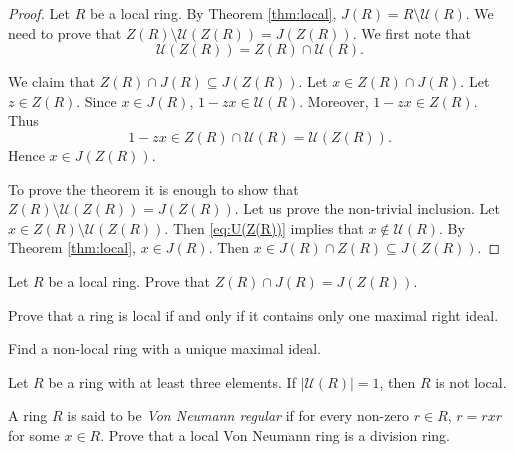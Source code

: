 \begin{proof}
    Let $R$ be a local ring. By Theorem \ref{thm:local}, $J(R)=R\setminus\mathcal{U}(R)$.  
    We need to prove that $Z(R)\setminus\mathcal{U}(Z(R))=J(Z(R))$. 
    We first note that
    \begin{equation}
    \label{eq:U(Z(R))}
        \mathcal{U}(Z(R))=Z(R)\cap\mathcal{U}(R).
    \end{equation}
    
    We claim that $Z(R)\cap J(R)\subseteq J(Z(R))$.  
    Let $x\in Z(R)\cap J(R)$. Let $z\in Z(R)$. Since $x\in J(R)$, $1-zx\in\mathcal{U}(R)$.
    Moreover, $1-zx\in Z(R)$. Thus 
    \[
    1-zx\in Z(R)\cap\mathcal{U}(R)=\mathcal{U}(Z(R)).
    \]
    Hence $x\in J(Z(R))$. 

    To prove the theorem it is enough to show that 
    $Z(R)\setminus\mathcal{U}(Z(R))=J(Z(R))$. Let us prove the non-trivial inclusion. 
    Let $x\in Z(R)\setminus\mathcal{U}(Z(R))$.  Then 
    \eqref{eq:U(Z(R))} implies that 
    $x\not\in\mathcal{U}(R)$. 
    By Theorem \ref{thm:local}, 
    $x\in J(R)$. Then $x\in J(R)\cap Z(R)\subseteq J(Z(R))$. 
\end{proof}

\begin{exercise}
\label{eq:local_center}
    Let $R$ be a local ring. Prove that 
    $Z(R)\cap J(R)=J(Z(R))$.  
\end{exercise}

\begin{exercise}
\label{xca:local_right}
    Prove that a ring is local if and only if it contains only one maximal right ideal.
\end{exercise}

\begin{exercise}
\label{xca:non_local1}
    Find a non-local ring with a unique maximal ideal. 
\end{exercise}

\begin{exercise}
\label{xca:non_local2}
    Let $R$ be a ring with at least three elements. 
    If $|\mathcal{U}(R)|=1$, then $R$ is not local. 
\end{exercise}


\begin{exercise}
\label{xca:VonNeumann_local}
    A ring $R$ is said to be \emph{Von Neumann regular} if  
    for every non-zero $r\in R$, $r=rxr$ for some $x\in R$. 
    Prove that a local Von Neumann ring is a division ring. 
\end{exercise}

